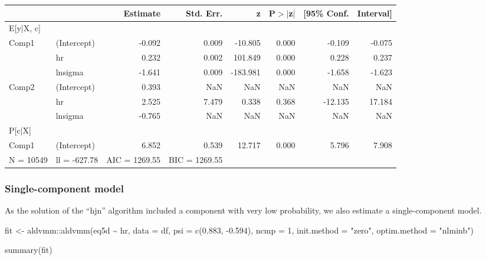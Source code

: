 \documentclass[
]{article}
\newenvironment{Shaded}{\begin{snugshade}}{\end{snugshade}}
\newcommand{\AttributeTok}[1]{\textcolor[rgb]{0.77,0.63,0.00}{#1}}
\newcommand{\DecValTok}[1]{\textcolor[rgb]{0.00,0.00,0.81}{#1}}
\newcommand{\FloatTok}[1]{\textcolor[rgb]{0.00,0.00,0.81}{#1}}
\newcommand{\FunctionTok}[1]{\textcolor[rgb]{0.00,0.00,0.00}{#1}}
\newcommand{\NormalTok}[1]{#1}
\newcommand{\OtherTok}[1]{\textcolor[rgb]{0.56,0.35,0.01}{#1}}
\newcommand{\SpecialCharTok}[1]{\textcolor[rgb]{0.00,0.00,0.00}{#1}}
\newcommand{\StringTok}[1]{\textcolor[rgb]{0.31,0.60,0.02}{#1}}
\begin{document}
\begin{table}[ht]
\centering
\begin{tabular}{llrrrrrr}
  \hline
 &  & Estimate & Std. Err. & z & P$>$$|$z$|$ & [95\% Conf.  & Interval] \\ 
  \hline
E[y$|$X, c] &  &  &  &  &  &  &  \\ 
   \hline
Comp1 & (Intercept) & -0.092 & 0.009 & -10.805 & 0.000 & -0.109 & -0.075 \\ 
   & hr &  0.232 & 0.002 & 101.849 & 0.000 &  0.228 &  0.237 \\ 
   & lnsigma & -1.641 & 0.009 & -183.981 & 0.000 & -1.658 & -1.623 \\ 
  Comp2 & (Intercept) & 0.393 &   NaN &   NaN &   NaN &     NaN &    NaN \\ 
   & hr & 2.525 & 7.479 & 0.338 & 0.368 & -12.135 & 17.184 \\ 
   & lnsigma & -0.765 & NaN & NaN & NaN & NaN & NaN \\ 
   \hline
P[c$|$X] &  &  &  &  &  &  &  \\ 
   \hline
Comp1 & (Intercept) & 6.852 & 0.539 & 12.717 & 0.000 & 5.796 & 7.908 \\ 
   \hline
N = 10549 & ll = -627.78 & AIC = 1269.55 & BIC = 1269.55 &  &  &  &  \\ 
  \end{tabular}
\end{table}

\hypertarget{single-component-model}{%
\subsubsection{Single-component model}\label{single-component-model}}

As the solution of the ``hjn'' algorithm included a component with very low probability, we also estimate a single-component model.

\begin{Shaded}
\begin{Highlighting}[]
\NormalTok{fit }\OtherTok{\textless{}{-}}\NormalTok{ aldvmm}\SpecialCharTok{::}\FunctionTok{aldvmm}\NormalTok{(eq5d }\SpecialCharTok{\textasciitilde{}}\NormalTok{ hr,}
                      \AttributeTok{data =}\NormalTok{ df,}
                      \AttributeTok{psi =} \FunctionTok{c}\NormalTok{(}\FloatTok{0.883}\NormalTok{, }\SpecialCharTok{{-}}\FloatTok{0.594}\NormalTok{),}
                      \AttributeTok{ncmp =} \DecValTok{1}\NormalTok{,}
                      \AttributeTok{init.method =} \StringTok{"zero"}\NormalTok{,}
                      \AttributeTok{optim.method =} \StringTok{"nlminb"}\NormalTok{)}

\FunctionTok{summary}\NormalTok{(fit)}
\end{Highlighting}
\end{Shaded}
\end{document}
